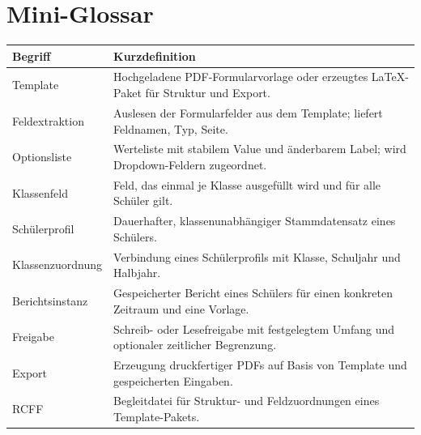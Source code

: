 \documentclass[12pt,a4paper]{article}
\begin{document}
\section{Mini-Glossar}
\begin{tabularx}{\textwidth}{|l|X|}
\hline
\textbf{Begriff} & \textbf{Kurzdefinition}\\
\hline
Template & Hochgeladene PDF-Formularvorlage oder erzeugtes LaTeX-Paket für Struktur und Export.\\
\hline
Feldextraktion & Auslesen der Formularfelder aus dem Template; liefert Feldnamen, Typ, Seite.\\
\hline
Optionsliste & Werteliste mit stabilem Value und änderbarem Label; wird Dropdown-Feldern zugeordnet.\\
\hline
Klassenfeld & Feld, das einmal je Klasse ausgefüllt wird und für alle Schüler gilt.\\
\hline
Schülerprofil & Dauerhafter, klassenunabhängiger Stammdatensatz eines Schülers.\\
\hline
Klassenzuordnung & Verbindung eines Schülerprofils mit Klasse, Schuljahr und Halbjahr.\\
\hline
Berichtsinstanz & Gespeicherter Bericht eines Schülers für einen konkreten Zeitraum und eine Vorlage.\\
\hline
Freigabe & Schreib- oder Lesefreigabe mit festgelegtem Umfang und optionaler zeitlicher Begrenzung.\\
\hline
Export & Erzeugung druckfertiger PDFs auf Basis von Template und gespeicherten Eingaben.\\
\hline
RCFF & Begleitdatei für Struktur- und Feldzuordnungen eines Template-Pakets.\\
\hline
\end{tabularx}

\clearpage
{}
{}
\printindex
\end{document}
